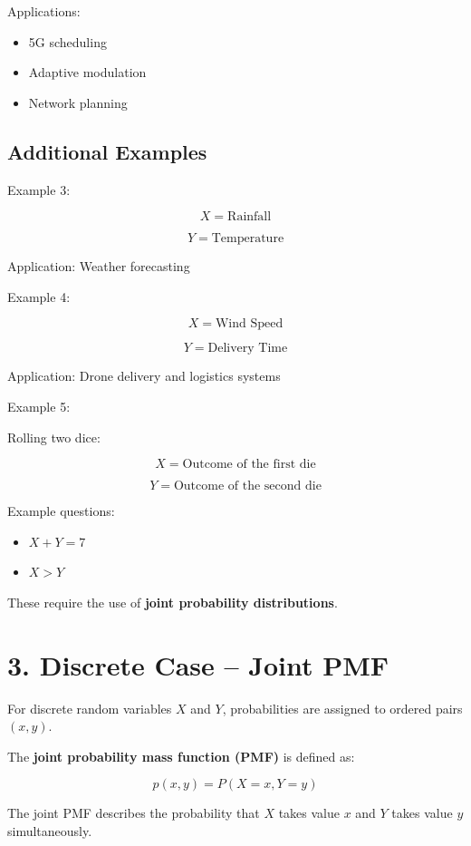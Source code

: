 \documentclass{article}
\begin{document}
\bigskip

Applications:

\begin{itemize}
\item 5G scheduling
\item Adaptive modulation
\item Network planning
\end{itemize}

\bigskip

\subsection*{Additional Examples}

Example 3:

\[
X = \text{Rainfall}
\]

\[
Y = \text{Temperature}
\]

Application: Weather forecasting

Example 4:

\[
X = \text{Wind Speed}
\]

\[
Y = \text{Delivery Time}
\]

Application: Drone delivery and logistics systems

Example 5:

Rolling two dice:

\[
X = \text{Outcome of the first die}
\]

\[
Y = \text{Outcome of the second die}
\]

Example questions:

\begin{itemize}
\item $X + Y = 7$
\item $X > Y$
\end{itemize}

These require the use of \textbf{joint probability distributions}.

\bigskip

\section*{3. Discrete Case – Joint PMF}

For discrete random variables $X$ and $Y$, probabilities are assigned to ordered pairs $(x, y)$.

The \textbf{joint probability mass function (PMF)} is defined as:

\[
p(x, y) = P(X = x, Y = y)
\]

The joint PMF describes the probability that $X$ takes value $x$ and $Y$ takes value $y$ simultaneously.
\end{document}
